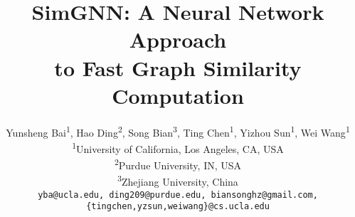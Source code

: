 \documentclass[sigconf]{acmart}
\begin{document}


\title{SimGNN: A Neural Network Approach \\ to Fast Graph Similarity Computation
}

\author{
  Yunsheng Bai\textsuperscript{1}, Hao Ding\textsuperscript{2}, Song Bian\textsuperscript{3}, Ting Chen\textsuperscript{1}, Yizhou Sun\textsuperscript{1}, Wei Wang\textsuperscript{1}
    \\
  \textsuperscript{1}University of California, Los Angeles, CA, USA \\
  \textsuperscript{2}Purdue University, IN, USA \\
  \textsuperscript{3}Zhejiang University, China \\
  \texttt{yba@ucla.edu, ding209@purdue.edu, biansonghz@gmail.com, \{tingchen,yzsun,weiwang\}@cs.ucla.edu} \\
}
\end{document}
